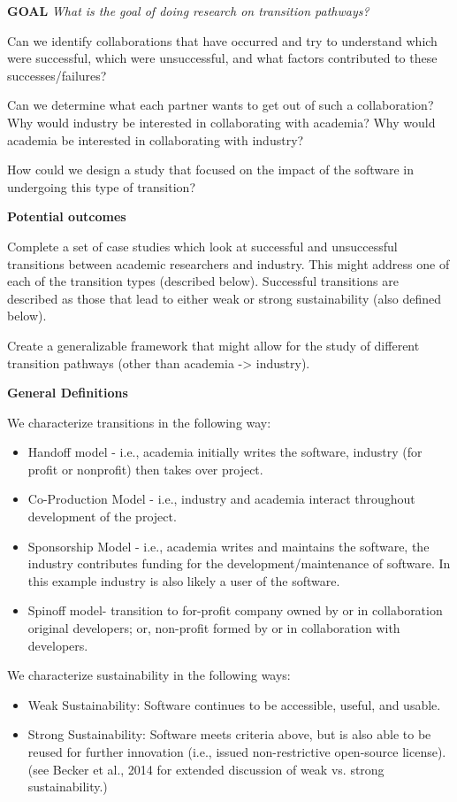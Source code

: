 \textbf{GOAL}
\emph{What is the goal of doing research on transition pathways?} 

Can we identify collaborations that have occurred and try to understand which were successful, which were unsuccessful, and what factors contributed to these successes/failures? 

Can we determine what each partner wants to get out of such a collaboration? Why would industry be interested in collaborating with academia?  Why would academia be interested in collaborating with industry?

How could we design a study that focused on the impact of the software in undergoing this type of transition?   

\textbf{Potential outcomes}

Complete a set of case studies which look at successful and unsuccessful transitions between academic researchers and industry. This might address one of each of the transition types (described below). Successful transitions are described as those that lead to either weak or strong sustainability (also defined below). 

Create a generalizable framework that might allow for the study of different transition pathways (other than academia -> industry). 

\textbf{General Definitions}

We characterize transitions in the following way:

\begin{itemize}
\item Handoff model - i.e., academia initially writes the software, industry (for profit or nonprofit) then takes over project. 
\item Co-Production Model - i.e., industry and academia interact throughout development of the project.
\item Sponsorship Model  - i.e., academia writes and maintains the software, the industry contributes funding for the development/maintenance of software. In this example industry is also likely a user of the software.
\item Spinoff model- transition to for-profit company owned by or in collaboration original developers; or, non-profit formed by or in collaboration with developers. 
\end{itemize}

We characterize sustainability in the following ways:

\begin{itemize}
\item Weak Sustainability: Software continues to be accessible, useful, and usable. 
\item Strong Sustainability: Software meets criteria above, but is also able to be reused for further innovation (i.e., issued non-restrictive open-source license). (see Becker et al., 2014 for extended discussion of weak vs. strong sustainability.)
\end{itemize}

